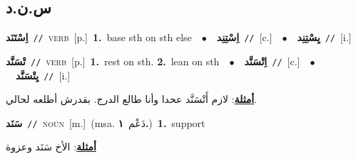 \documentclass[10pt,a4paper,twoside]{article} %
\begin{document}
\begin{multicols}{2}
\vspace{-3mm}
\subsection*{\color{blue}\foreignlanguage{arabic}{س.ن.د}\color{blue}{}} 

{\setlength\topsep{0pt}\textbf{\foreignlanguage{arabic}{اِسْتَنَد}}\ {\color{gray}\texttt{//}\color{black}}\ \textsc{verb}\ [p.]\ \textbf{1.}~base sth on sth else\ \ $\bullet$\ \ \setlength\topsep{0pt}\textbf{\foreignlanguage{arabic}{اِسْتِنِد}}\ {\color{gray}\texttt{//}\color{black}}\ [c.]\ \ $\bullet$\ \ \setlength\topsep{0pt}\textbf{\foreignlanguage{arabic}{يِسْتِنِد}}\ {\color{gray}\texttt{//}\color{black}}\ [i.]\ } \vspace{2mm}

{\setlength\topsep{0pt}\textbf{\foreignlanguage{arabic}{تْسَنَّد}}\ {\color{gray}\texttt{//}\color{black}}\ \textsc{verb}\ [p.]\ \textbf{1.}~rest on sth.  \textbf{2.}~lean on sth\ \ $\bullet$\ \ \setlength\topsep{0pt}\textbf{\foreignlanguage{arabic}{اِتْسَنَّد}}\ {\color{gray}\texttt{//}\color{black}}\ [c.]\ \ $\bullet$\ \ \setlength\topsep{0pt}\textbf{\foreignlanguage{arabic}{يِتْسَنَّد}}\ {\color{gray}\texttt{//}\color{black}}\ [i.]\  \begin{flushright}\color{gray}\foreignlanguage{arabic}{\textbf{\underline{\foreignlanguage{arabic}{أمثلة}}}: لازم أَتْسَنَّد عحدا وأنا طالع الدرج. بقدرش أطلعه لحالي.}\end{flushright}\color{black}} \vspace{2mm}

{\setlength\topsep{0pt}\textbf{\foreignlanguage{arabic}{سَنَد}}\ {\color{gray}\texttt{//}\color{black}}\ \textsc{noun}\ [m.]\ \color{gray}(msa. \foreignlanguage{arabic}{دَعْم}~\foreignlanguage{arabic}{\textbf{١.}})\color{black}\ \textbf{1.}~support\  \begin{flushright}\color{gray}\foreignlanguage{arabic}{\textbf{\underline{\foreignlanguage{arabic}{أمثلة}}}: الأخ سَنَد وعزوة}\end{flushright}\color{black}} \vspace{2mm}


\end{multicols}
\end{document}
